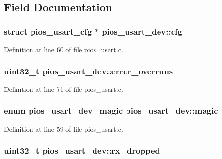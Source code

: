 \subsection{\-Field \-Documentation}
\hypertarget{structpios__usart__dev_a33767fade40ae8e9eca5f70ee46ab5e0}{
\subsubsection[{cfg}]{\setlength{\rightskip}{0pt plus 5cm}struct {\bf pios\-\_\-usart\-\_\-cfg} $\ast$ {\bf pios\-\_\-usart\-\_\-dev\-::cfg}}}\label{structpios__usart__dev_a33767fade40ae8e9eca5f70ee46ab5e0}


\-Definition at line 60 of file pios\-\_\-usart.\-c.

\hypertarget{structpios__usart__dev_a39136a16dedc7d092749a2c36ef899c5}{
\subsubsection[{error\-\_\-overruns}]{\setlength{\rightskip}{0pt plus 5cm}uint32\-\_\-t {\bf pios\-\_\-usart\-\_\-dev\-::error\-\_\-overruns}}}\label{structpios__usart__dev_a39136a16dedc7d092749a2c36ef899c5}


\-Definition at line 71 of file pios\-\_\-usart.\-c.

\hypertarget{structpios__usart__dev_a687addd5d60a08b8e9f1387f3c82e8a8}{
\subsubsection[{magic}]{\setlength{\rightskip}{0pt plus 5cm}enum {\bf pios\-\_\-usart\-\_\-dev\-\_\-magic} {\bf pios\-\_\-usart\-\_\-dev\-::magic}}}\label{structpios__usart__dev_a687addd5d60a08b8e9f1387f3c82e8a8}


\-Definition at line 59 of file pios\-\_\-usart.\-c.

\hypertarget{structpios__usart__dev_afe1832deba4f05c2cb5c33a0f397caa5}{
\subsubsection[{rx\-\_\-dropped}]{\setlength{\rightskip}{0pt plus 5cm}uint32\-\_\-t {\bf pios\-\_\-usart\-\_\-dev\-::rx\-\_\-dropped}}}\label{structpios__usart__dev_afe1832deba4f05c2cb5c33a0f397caa5}


